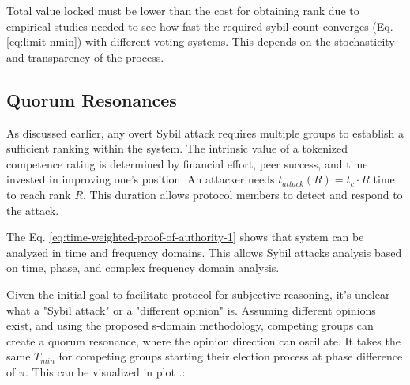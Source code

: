 \documentclass{article}
\begin{document}
\begin{CJK}{UTF8}{gbsn}
    Total value locked must be lower than the cost for obtaining rank due to empirical studies needed to see how fast the required sybil count converges (Eq. \ref{eq:limit-nmin}) with different voting systems. This depends on the stochasticity and transparency of the process.

    \subsection{Quorum Resonances}
    \label{sec:time-constraint}

    As discussed earlier, any overt Sybil attack requires multiple groups to establish a sufficient ranking within the system. The intrinsic value of a tokenized competence rating is determined by financial effort, peer success, and time invested in improving one's position. An attacker needs $t_{attack}(R) = t_c \cdot R$ time to reach rank $R$. This duration allows protocol members to detect and respond to the attack.

    The Eq. \ref{eq:time-weighted-proof-of-authority-1} shows that system can be analyzed in time and frequency domains. This allows Sybil attacks analysis based on time, phase, and complex frequency domain analysis.

    Given the initial goal to facilitate protocol for subjective reasoning, it's unclear what a "Sybil attack" or a "different opinion" is. Assuming different opinions exist, and using the proposed s-domain methodology, competing groups can create a quorum resonance, where the opinion direction can oscillate. It takes the same $T_{min}$ for competing groups starting their election process at phase difference of $\pi$. This can be visualized in plot .:

    \begin{figure}[ht]
        \centering
\end{figure}
\end{CJK}
\end{document}
